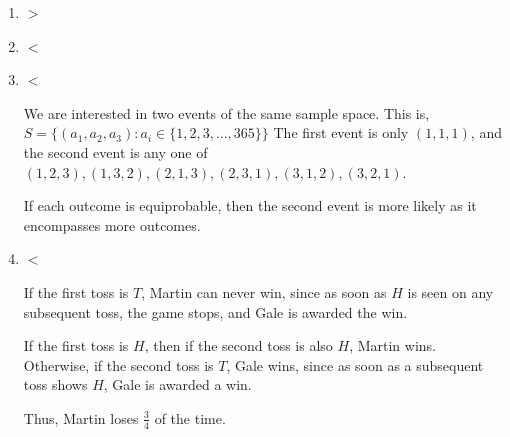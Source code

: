 \begin{enumerate}[label=(\alph*)]

\item $>$

\item $<$

\item $<$

We are interested in two events of the same sample space. 
This is, $S = \{(a_{1}, a_{2}, a_{3}) : a_{i} \in \{1, 2, 3, ..., 365\}\}$
The first event is only $(1, 1, 1)$, and the second event is any one of $(1, 2, 3), (1,3,2),(2,1,3),(2,3,1),(3,1,2),(3,2,1)$.

If each outcome is equiprobable, then the second event is more likely as it encompasses more outcomes. 

\item $<$ 

If the first toss is $T$, Martin can never win, since as soon as $H$ is seen 
on any subsequent toss, the game stops, and Gale is awarded the win.

If the first toss is $H$, then if the second toss is also $H$, Martin wins. 
Otherwise, if the second toss is $T$, Gale wins, since as soon as a subsequent 
toss shows $H$, Gale is awarded a win.

Thus, Martin loses $\frac{3}{4}$ of the time.
\end{enumerate}
